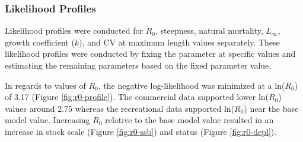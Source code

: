 \documentclass[11pt,
  english,
  letterpaper,
]{article}
\begin{document}
\leavevmode\tagmcend\tagstructend\par


\hypertarget{likelihood-profiles}{%
\subsubsection{Likelihood Profiles}\label{likelihood-profiles}}

\leavevmode\tagmcend\tagstructend


Likelihood profiles were conducted for {\(R_0\)\leavevmode\tagmcend\tagstructend}, steepness, natural mortality, {\(L_{\infty}\)\leavevmode\tagmcend\tagstructend}, growth coefficient ({\(k\)\leavevmode\tagmcend\tagstructend}), and CV at maximum length values separately. These likelihood profiles were conducted by fixing the parameter at specific values and estimating the remaining parameters based on the fixed parameter value.

\leavevmode\tagmcend\tagstructend\par


In regards to values of {\(R_0\)\leavevmode\tagmcend\tagstructend}, the negative log-likelihood was minimized at a ln({\(R_0\)\leavevmode\tagmcend\tagstructend}) of 3.17 (Figure \ref{fig:r0-profile}). The commercial data supported lower ln({\(R_0\)\leavevmode\tagmcend\tagstructend}) values around 2.75 whereas the recreational data supported ln({\(R_0\)\leavevmode\tagmcend\tagstructend}) near the base model value. Increasing {\(R_0\)\leavevmode\tagmcend\tagstructend} relative to the base model value resulted in an increase in stock scale (Figure \ref{fig:r0-ssb}) and status (Figure \ref{fig:r0-depl}).

\leavevmode\tagmcend\tagstructend\par

\end{document}

